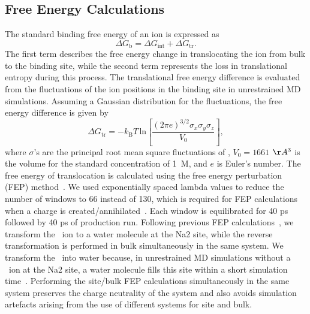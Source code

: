 \subsection{Free Energy Calculations}
The standard binding free energy of an ion is expressed as~\cite{Boresch2003}
\begin{equation}
\Delta G_{\text{b}} = \Delta G_{\text{int}} + \Delta G_{\text{tr}}.
\end{equation}
The first term describes the free energy change in translocating the ion from bulk to the binding 
site, while the second term represents the loss in translational entropy during this process. The 
translational free energy difference is evaluated from the fluctuations of the ion positions in the 
binding site in unrestrained MD simulations. Assuming a Gaussian distribution for the fluctuations, 
the free energy difference is given by~\cite{Carlsson2005}
\begin{equation}
\Delta G_{\text{tr}} = -k_{\text{B}}T\, \text{ln} \left[\frac{(2\pi e)^{3/2}\sigma_{x}\sigma_{y}\sigma_{z}}{V_{0}} \right],
\end{equation} 
where $\sigma$'s are the principal root mean square fluctuations of \Na, $V_{0} = 1661$ $\AA^{3}$ is 
the volume for the standard concentration of 1~M, and $e$ is Euler's number. The free energy of 
translocation is calculated using the free energy perturbation (FEP) method~\cite{Chipot2007}. We 
used exponentially spaced lambda values to reduce the number of windows to 66 instead of 130, which 
is required for FEP calculations when a charge is created/annihilated~\cite{Heinzelmann2011}. Each 
window is equilibrated for 40 ps followed by 40 ps of production run. Following previous FEP 
calculations~\cite{Heinzelmann2011}, we transform the \Na\ ion to a water molecule at the Na2 site, 
while the reverse transformation is performed in bulk simultaneously in the same system. We 
transform the \Na\ into water because, in unrestrained MD simulations without a \Na\ ion at the 
Na2 site, a water molecule fills this site within a short simulation time~\cite{Heinzelmann2011}. 
Performing the site/bulk FEP calculations simultaneously in the same system preserves the charge 
neutrality of the system and also avoids simulation artefacts arising from the use of different systems 
for site and bulk.

